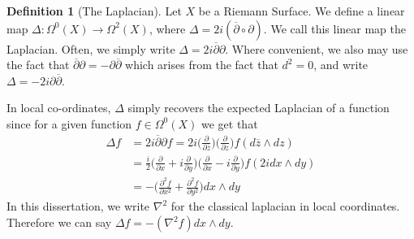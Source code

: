 \documentclass[11pt]{report}
\theoremstyle{definition}
\newtheorem{defn}[thm]{Definition}
\begin{document}
\begin{defn}[The Laplacian]\label{LaplacianDef}
  Let $X$ be a Riemann Surface. We define a linear map $\Delta:\Omega^0(X)\rightarrow \Omega^2(X)$, where $\Delta=2i(\overline{\partial}\circ \partial)$. We call this linear map the Laplacian. Often, we simply write $\Delta=2i\overline{\partial}\partial$. Where convenient, we also may use the fact that $\overline{\partial}\partial = -\partial\overline{\partial}$ which arises from the fact that $d^2 = 0$, and write $\Delta = -2i\partial\overline{\partial}$.
\end{defn}
In local co-ordinates, $\Delta$ simply recovers the expected Laplacian of a function since for a given function $f\in \Omega^0(X)$ we get that 
\begin{align*}
  \Delta f &= 2i\overline{\partial }\partial f = 2i\Big(\frac{\partial}{\partial\overline{z}}\Big)\Big(\frac{\partial}{\partial z}\Big)f(d\overline{z}\wedge dz) \\
  &=\frac{i}{2}\Big(\frac{\partial}{\partial x} + i\frac{\partial}{\partial y}\Big)\Big(\frac{\partial}{\partial x} - i\frac{\partial}{\partial y}\Big)f(2idx\wedge dy) \\
  &= -\Big(\frac{\partial^2 f}{\partial x^2} + \frac{\partial^2 f}{\partial y^2}\Big)dx\wedge dy 
\end{align*}
In this dissertation, we write $\nabla^2$ for the classical laplacian in local coordinates. Therefore we can say $\Delta f = -(\nabla^2 f) dx\wedge dy$.
\end{document}
